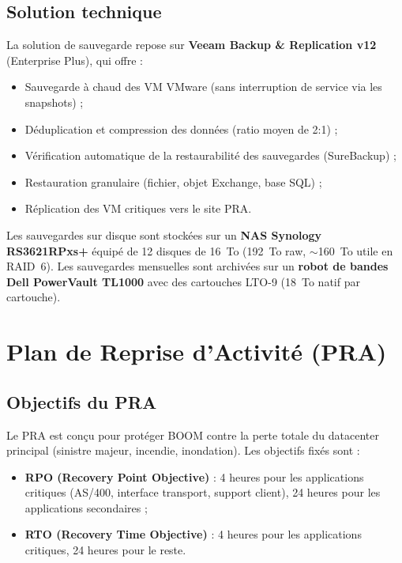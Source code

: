 \documentclass[12pt,a4paper]{report}
\begin{document}
\subsection{Solution technique}

La solution de sauvegarde repose sur \textbf{Veeam Backup \& Replication v12} (Enterprise Plus), qui offre :

\begin{itemize}
\item Sauvegarde à chaud des VM VMware (sans interruption de service via les snapshots) ;
\item Déduplication et compression des données (ratio moyen de 2:1) ;
\item Vérification automatique de la restaurabilité des sauvegardes (SureBackup) ;
\item Restauration granulaire (fichier, objet Exchange, base SQL) ;
\item Réplication des VM critiques vers le site PRA.
\end{itemize}

Les sauvegardes sur disque sont stockées sur un \textbf{NAS Synology RS3621RPxs+} équipé de 12 disques de 16~To (192~To raw, $\sim$160~To utile en RAID~6). Les sauvegardes mensuelles sont archivées sur un \textbf{robot de bandes Dell PowerVault TL1000} avec des cartouches LTO-9 (18~To natif par cartouche).

\section{Plan de Reprise d'Activité (PRA)}

\subsection{Objectifs du PRA}

Le PRA est conçu pour protéger BOOM contre la perte totale du datacenter principal (sinistre majeur, incendie, inondation). Les objectifs fixés sont :

\begin{itemize}
\item \textbf{RPO (Recovery Point Objective)} : 4 heures pour les applications critiques (AS/400, interface transport, support client), 24 heures pour les applications secondaires ;
\item \textbf{RTO (Recovery Time Objective)} : 4 heures pour les applications critiques, 24 heures pour le reste.
\end{itemize}
\end{document}
